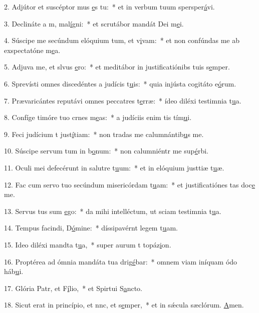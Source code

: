 2. Adjútor et suscéptor mus \uline{e}s tu:~* et in verbum tuum spersper\uline{á}vi.\par 
3. Declináte a m, mal\uline{í}gni:~* et scrutábor mandát Dei m\uline{e}i.\par 
4. Súscipe me secúndum elóquium tum, et v\uline{i}vam:~* et non confúndas me ab exspectatóne m\uline{e}a.\par 
5. Adjuva me, et slvus \uline{e}ro:~* et meditábor in justificatiónibs tuis s\uline{e}mper.\par 
6. Sprevísti omnes discedéntes a judícis t\uline{u}is:~* quia injústa cogitáto e\uline{ó}rum.\par 
7. Prævaricántes reputávi omnes peccatres t\uline{e}rræ:~* ídeo diléxi testimnia t\uline{u}a.\par 
8. Confíge timóre tuo crnes m\uline{e}as:~* a judíciis enim tis tím\uline{u}i.\par 
9. Feci judícium t just\uline{í}tiam:~* non tradas me calumnántib\uline{u}s me.\par 
10. Súscipe servum tum in b\uline{o}num:~* non calumniéntr me sup\uline{é}rbi.\par 
11. Oculi mei defecérunt in salutre t\uline{u}um:~* et in elóquium justtiæ t\uline{u}æ.\par 
12. Fac cum servo tuo secúndum misericórdam t\uline{u}am:~* et justificatiónes tas doc\uline{e} me.\par 
13. Servus tus sum \uline{e}go:~* da mihi intelléctum, ut sciam testimnia t\uline{u}a.\par 
14. Tempus facindi, D\uline{ó}mine:~* díssipavérnt legem t\uline{u}am.\par 
15. Ideo diléxi mandta t\uline{u}a,~* super aurum t topáz\uline{i}on.\par 
16. Proptérea ad ómnia mandáta tua drig\uline{é}bar:~* omnem viam iníquam ódo háb\uline{u}i.\par 
17. Glória Patr, et F\uline{í}lio,~* et Spirtui S\uline{a}ncto.\par 
18. Sicut erat in princípio, et nnc, et s\uline{e}mper,~* et in sǽcula sæclórum. \uline{A}men.\par 
